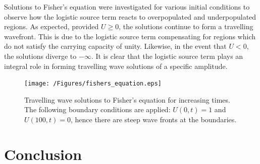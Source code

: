 \documentclass[11pt,a4paper]{article}
\begin{document}
		Solutions to Fisher's equation were investigated for various initial conditions to observe how the logistic source term reacts to overpopulated and underpopulated regions. As expected, provided $U \ge 0$, the solutions continue to form a travelling wavefront. This is due to the logistic source term compensating for regions which do not satisfy the carrying capacity of unity. Likewise, in the event that $U < 0$, the solutions diverge to $-\infty$. It is clear that the logistic source term plays an integral role in forming travelling wave solutions of a specific amplitude.

		\begin{figure}[tbh]
			\centering
				\texttt{[image: /Figures/fishers\_equation.eps]}
			\caption{Travelling wave solutions to Fisher's equation for increasing times. The following boundary conditions are applied: $U(0, t) = 1$ and $U(100, t) = 0$, hence there are steep wave fronts at the boundaries.}
			\label{fig:fishers_equation_sol_pdepe}
		\end{figure}
	


\section{Conclusion}
	\label{sec:conclusion}
	
	



\clearpage
\printbibliography
\end{document}
